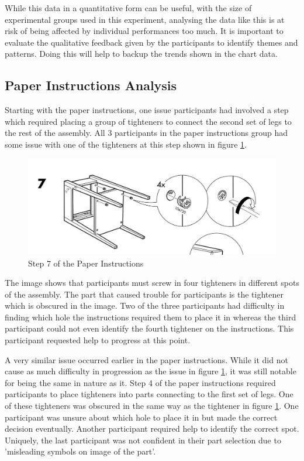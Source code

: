 \documentclass{l4proj}
\begin{document}
While this data in a quantitative form can be useful, with the size of experimental groups used in this experiment, analysing the data like this is at risk of being affected by individual performances too much. It is important to evaluate the qualitative feedback given by the participants to identify themes and patterns. Doing this will help to backup the trends shown in the chart data.

\subsection{Paper Instructions Analysis}

Starting with the paper instructions, one issue participants had involved a step which required placing a group of tighteners to connect the second set of legs to the rest of the assembly. All 3 participants in the paper instructions group had some issue with one of the tighteners at this step shown in figure \ref{fig:paper7}.

\begin{figure}[hbt!]
    \centering
    \includegraphics[width=0.75\linewidth]{dissertation//images/instructionsStep7.jpg}
    \caption{Step 7 of the Paper Instructions \cite{noauthor_hemnes_nodate}}
    \label{fig:paper7}
\end{figure}

The image shows that participants must screw in four tighteners in different spots of the assembly. The part that caused trouble for participants is the tightener which is obscured in the image. Two of the three participants had difficulty in finding which hole the instructions required them to place it in whereas the third participant could not even identify the fourth tightener on the instructions. This participant requested help to progress at this point. 

A very similar issue occurred earlier in the paper instructions. While it did not cause as much difficulty in progression as the issue in figure \ref{fig:paper7}, it was still notable for being the same in nature as it. Step 4 of the paper instructions required participants to place tighteners into parts connecting to the first set of legs. One of these tighteners was obscured in the same way as the tightener in figure \ref{fig:paper7}. One participant was unsure about which hole to place it in but made the correct decision eventually. Another participant required help to identify the correct spot. Uniquely, the last participant was not confident in their part selection due to 'misleading symbols on image of the part'.
\end{document}
